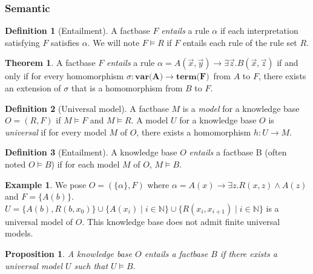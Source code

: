 \documentclass{article}
\newtheorem{proposition}{Proposition}[section]
\theoremstyle{definition}
\newtheorem{definition}{Definition}[section]
\newtheorem{theorem}{Theorem}[section]
\newtheorem{example}{Example}[section]
\theoremstyle{remark}
\def \N {\mathbb N}
\begin{document}
\subsubsection{Semantic}

\begin{definition}[Entailment]
A factbase $F$ \emph{entails} a rule $\alpha$ if each interpretation satisfying $F$ satisfies $\alpha$. We will note $F \models R$ if $F$ entails each rule of the rule set $R$.
\end{definition}

\begin{theorem}
A factbase $F$ \emph{entails} a rule $\alpha = A(\vec x,\vec y) \rightarrow \exists \vec z. B(\vec x,\vec z)$ if and only if for every homomorphism $\sigma: \textbf{var(A)} \to \textbf{term(F)}$\ from $A$ to $F$, there exists an extension of $\sigma$ that is a homomorphism from $B$ to $F$.
\end{theorem}



\begin{definition}[Universal model]
A factbase $M$ is a \emph{model} for a knowledge base $O = (R,F)$ if $M \models F$ and $M \models R$.  A model $U$ for a knowledge base $O$ is \emph{universal} if for
every model $M$ of $O$, there exists a homomorphism $h : U \to M$.
\end{definition}

\begin{definition}[Entailment]
A knowledge base $O$ \emph{entails} a factbase B (often noted $O \models B$) if for each model $M$ of $O$, $M \models B$.
\end{definition}

\begin{example} We pose $O = (\{\alpha\},F)$ where $\alpha = A(x) \rightarrow \exists z.R(x,z) \wedge A(z)$ and $F = \{A(b)\}$. $U = \{A(b),R(b,x_0)\}\cup \{A(x_i)\mid i \in \N\}\cup \{R(x_i,x_{i+1}) \mid i \in \N\}$ is a universal model of $O$. This knowledge base does not admit finite universal models.
\end{example}


\begin{proposition}
A knowledge base $O$ entails a factbase $B$ if there exists a universal model $U$ such that $U \models B$.
\end{proposition}
\end{document}
